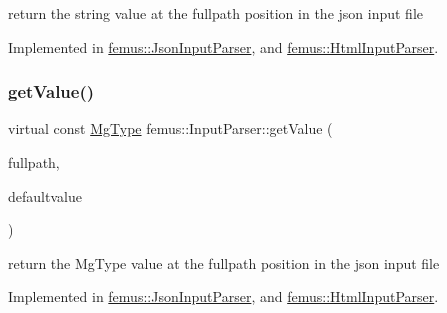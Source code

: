 return the string value at the {\ttfamily fullpath} position in the json input file 

Implemented in \mbox{\hyperlink{classfemus_1_1_json_input_parser_af9cad72e2f40793edb81d8136342cf40}{femus\+::\+Json\+Input\+Parser}}, and \mbox{\hyperlink{classfemus_1_1_html_input_parser_ac2df186f98b11d4ccbb0ec2ff4915c86}{femus\+::\+Html\+Input\+Parser}}.

\mbox{\label{classfemus_1_1_input_parser_a8ce06a6bc1112d4581b6fad9e7aad858}} 
\subsubsection{\texorpdfstring{get\+Value()}{getValue()}\hspace{0.1cm}{\footnotesize\ttfamily [6/6]}}
{\footnotesize\ttfamily virtual const \mbox{\hyperlink{_mg_type_enum_8hpp_a35aafc39068a269f658aac64338aa781}{Mg\+Type}} femus\+::\+Input\+Parser\+::get\+Value (\begin{DoxyParamCaption}\item[{const std\+::string \&}]{fullpath,  }\item[{const \mbox{\hyperlink{_mg_type_enum_8hpp_a35aafc39068a269f658aac64338aa781}{Mg\+Type}}}]{defaultvalue }\end{DoxyParamCaption})\hspace{0.3cm}{\ttfamily [pure virtual]}}

return the Mg\+Type value at the {\ttfamily fullpath} position in the json input file 

Implemented in \mbox{\hyperlink{classfemus_1_1_json_input_parser_a6851a934e4f6fa21195bbaef6f3999d9}{femus\+::\+Json\+Input\+Parser}}, and \mbox{\hyperlink{classfemus_1_1_html_input_parser_aad4f0541fa07993859ea2bc740b76aaa}{femus\+::\+Html\+Input\+Parser}}.

\mbox{\label{classfemus_1_1_input_parser_a08f0f52e28b4e9dfc5dcf7c1ba267938}} 
